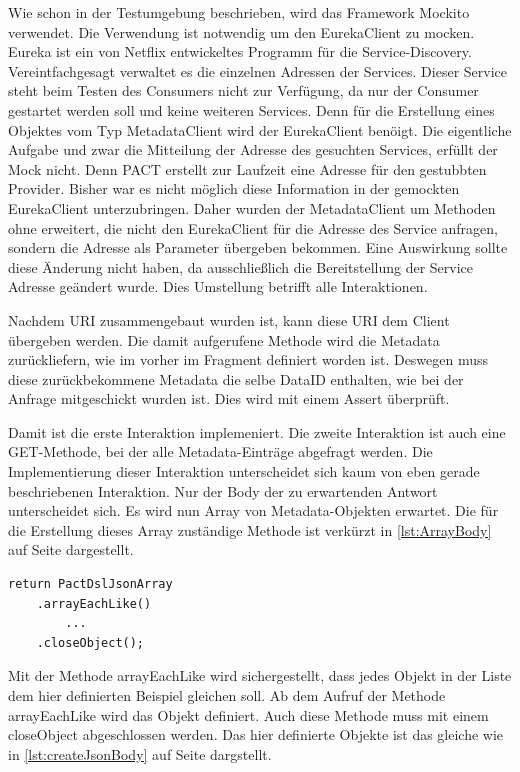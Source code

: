 \documentclass{llncs}
\begin{document}
Wie schon in der Testumgebung beschrieben, wird das Framework Mockito verwendet. Die Verwendung ist notwendig um den EurekaClient zu mocken. Eureka \cite{Ranganathan2012} ist ein von Netflix entwickeltes Programm für die Service-Discovery. Vereintfachgesagt verwaltet es die einzelnen Adressen der Services. Dieser Service steht beim Testen des Consumers nicht zur Verfügung, da nur der Consumer gestartet werden soll und keine weiteren Services. Denn für die Erstellung eines Objektes vom Typ MetadataClient wird der EurekaClient benöigt. Die eigentliche Aufgabe und zwar die Mitteilung der Adresse des gesuchten Services, erfüllt der Mock nicht. Denn PACT erstellt zur Laufzeit eine Adresse für den gestubbten Provider. Bisher war es nicht möglich diese Information in der gemockten EurekaClient unterzubringen. Daher wurden der MetadataClient um Methoden ohne erweitert, die nicht den EurekaClient für die Adresse des Service anfragen, sondern die Adresse als Parameter übergeben bekommen. Eine Auswirkung sollte diese Änderung nicht haben, da ausschließlich die Bereitstellung der Service Adresse geändert wurde. Dies Umstellung betrifft alle Interaktionen.

Nachdem URI zusammengebaut wurden ist, kann diese URI dem Client übergeben werden. Die damit aufgerufene Methode wird die Metadata zurückliefern, wie im vorher im Fragment definiert worden ist. Deswegen muss diese zurückbekommene Metadata die selbe DataID enthalten, wie bei der Anfrage mitgeschickt wurden ist. Dies wird mit einem Assert überprüft.

Damit ist die erste Interaktion implemeniert. Die zweite Interaktion ist auch eine GET-Methode, bei der alle Metadata-Einträge abgefragt werden. Die Implementierung dieser Interaktion unterscheidet sich kaum von eben gerade beschriebenen Interaktion. Nur der Body der zu erwartenden Antwort unterscheidet sich. Es wird nun Array von Metadata-Objekten erwartet. Die für die Erstellung dieses Array zuständige Methode ist verkürzt in \ref{lst:ArrayBody} auf Seite \pageref{lst:ArrayBody} dargestellt.

\lstset{language = Java}
\begin{lstlisting}[caption=Test,label={lst:ArrayBody}]
return PactDslJsonArray
    .arrayEachLike()
        ...
    .closeObject();
\end{lstlisting}

Mit der Methode arrayEachLike wird sichergestellt, dass jedes Objekt in der Liste dem hier definierten Beispiel gleichen soll. Ab dem Aufruf der Methode arrayEachLike wird das Objekt definiert. Auch diese Methode muss mit einem closeObject abgeschlossen werden. Das hier definierte Objekte ist das gleiche wie in \ref{lst:createJsonBody} auf Seite \pageref{lst:createJsonBody} dargstellt.
\end{document}
